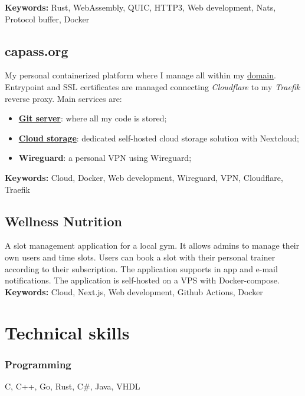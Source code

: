 \documentclass[11pt,a4paper]{article}
\begin{document}
  \textbf{Keywords:} Rust, WebAssembly, QUIC, HTTP3, Web development, Nats, Protocol buffer, Docker 
  
  \subsection{capass.org \href{https://github.com/alarmfox/personal-cloud}{\faGithub} \href{https://git.capass.org}{\faGit} \href{https://cloud.capass.org}{\faCloud}}
  My personal containerized platform where I manage all within my \href{https://capass.org}{domain}. Entrypoint and SSL certificates are managed connecting \textit{Cloudflare} to my \textit{Traefik} reverse proxy. Main services are:
  \begin{itemize}
    \item \href{https://git.capass.org}{\textbf{Git server}}: where all my code is stored;
    \item \href{https://cloud.capass.org}{\textbf{Cloud storage}}: dedicated self-hosted cloud storage solution with Nextcloud;
    \item \textbf{Wireguard}: a personal VPN using Wireguard;
  \end{itemize}
  
  \textbf{Keywords:} Cloud, Docker, Web development, Wireguard, VPN, Cloudflare, Traefik

  \subsection{Wellness Nutrition \href{https://github.com/alarmfox/wellness-nutrition}{\faGithub} \href{https://wellnessdemo.capass.org}{\faLaptopCode}}
  A slot management application for a local gym. It allows admins to manage their own users and time slots. Users can book a slot with their personal trainer according to their subscription. The application supports in app and e-mail notifications. The application is self-hosted on a VPS with Docker-compose.\\

  \textbf{Keywords:} Cloud, Next.js, Web development, Github Actions, Docker

  \section{Technical skills}
  \subsubsection{Programming}
  C, C++, Go, Rust, C\#, Java, VHDL
\end{document}

